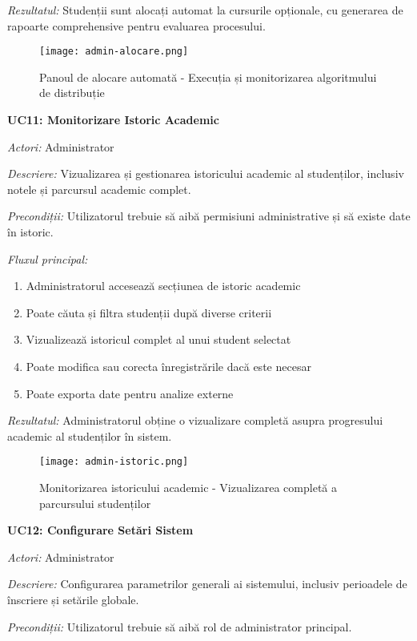 \documentclass[12pt,a4paper]{report}
\begin{document}
\textit{Rezultatul:} Studenții sunt alocați automat la cursurile opționale, cu generarea de rapoarte comprehensive pentru evaluarea procesului.

\begin{figure}[H]
\centering
\texttt{[image: admin-alocare.png]}
\caption{Panoul de alocare automată - Execuția și monitorizarea algoritmului de distribuție}
\label{fig:admin-alocare}
\end{figure}

\textbf{UC11: Monitorizare Istoric Academic}

\textit{Actori:} Administrator

\textit{Descriere:} Vizualizarea și gestionarea istoricului academic al studenților, inclusiv notele și parcursul academic complet.

\textit{Precondiții:} Utilizatorul trebuie să aibă permisiuni administrative și să existe date în istoric.

\textit{Fluxul principal:}
\begin{enumerate}
\item Administratorul accesează secțiunea de istoric academic
\item Poate căuta și filtra studenții după diverse criterii
\item Vizualizează istoricul complet al unui student selectat
\item Poate modifica sau corecta înregistrările dacă este necesar
\item Poate exporta date pentru analize externe
\end{enumerate}

\textit{Rezultatul:} Administratorul obține o vizualizare completă asupra progresului academic al studenților în sistem.

\begin{figure}[H]
\centering
\texttt{[image: admin-istoric.png]}
\caption{Monitorizarea istoricului academic - Vizualizarea completă a parcursului studenților}
\label{fig:admin-istoric}
\end{figure}

\textbf{UC12: Configurare Setări Sistem}

\textit{Actori:} Administrator

\textit{Descriere:} Configurarea parametrilor generali ai sistemului, inclusiv perioadele de înscriere și setările globale.

\textit{Precondiții:} Utilizatorul trebuie să aibă rol de administrator principal.
\end{document}
